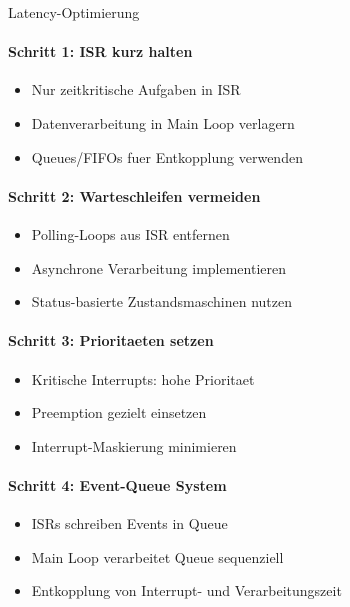 \begin{KR}{Latency-Optimierung}\\
    \paragraph{Schritt 1: ISR kurz halten}
    \begin{itemize}
        \item Nur zeitkritische Aufgaben in ISR
        \item Datenverarbeitung in Main Loop verlagern
        \item Queues/FIFOs fuer Entkopplung verwenden
    \end{itemize}
    
    \paragraph{Schritt 2: Warteschleifen vermeiden}
    \begin{itemize}
        \item Polling-Loops aus ISR entfernen
        \item Asynchrone Verarbeitung implementieren
        \item Status-basierte Zustandsmaschinen nutzen
    \end{itemize}
    
    \paragraph{Schritt 3: Prioritaeten setzen}
    \begin{itemize}
        \item Kritische Interrupts: hohe Prioritaet
        \item Preemption gezielt einsetzen
        \item Interrupt-Maskierung minimieren
    \end{itemize}
    
    \paragraph{Schritt 4: Event-Queue System}
    \begin{itemize}
        \item ISRs schreiben Events in Queue
        \item Main Loop verarbeitet Queue sequenziell
        \item Entkopplung von Interrupt- und Verarbeitungszeit
    \end{itemize}
\end{KR}


